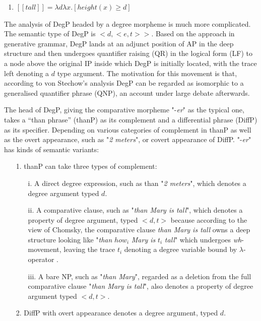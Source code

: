 \documentclass{ctexart}
\let \cite \parencite
\begin{document}
\begin{enumerate}[resume]
    \item \label{von_stechow_LE} $[\![tall]\!] = \lambda d \lambda x. [height(x) \geq d]$
\end{enumerate}

The analysis of DegP headed by a degree morpheme is much more complicated. The semantic type of DegP is $<d,<e,t>>$. Based on the approach in generative grammar, DegP lands at an adjunct position of AP in the deep structure and then undergoes quantifier raising (QR) in the logical form (LF) to a node above the original IP inside which DegP is initially located, with the trace left denoting a $d$ type argument. The motivation for this movement is that, according to von Stechow’s analysis DegP can be regarded as isomorphic to a generalised quantifier phrase (QNP), an account under large debate afterwards.

The head of DegP, giving the comparative morpheme "-\textit{er}" as the typical one, takes a “than phrase” (thanP) as its complement and a differential phrase (DiffP) as its specifier. Depending on various categories of complement in thanP as well as the overt appearance, such as "\textit{2 meters}", or covert appearance of DiffP. "-\textit{er}" has kinds of semantic variants:

\begin{itemize}
\item[1.]
thanP can take three types of complement:

\begin{itemize}
\item[i.]
A direct degree expression, such as than "\textit{2 meters}", which denotes a degree argument typed $d$.
\item[ii.]
A comparative clause, such as "\textit{than Mary is tall}", which denotes a property of degree argument, typed $<d,t>$ because according to the view of Chomsky, the comparative clause \textit{than Mary is tall} owns a deep structure looking like "\textit{than} $how_i$ \textit{Mary is} $t_i$ \textit{tall}" which undergoes \textit{wh}-movement, leaving the trace $t_i$ denoting a degree variable bound by $\lambda$-operator \cite{chomsky1977}.
\item[iii.]
A bare NP, such as "\textit{than Mary}", regarded as a deletion from the full comparative clause "\textit{than Mary is tall}", also denotes a property of degree argument typed $<d,t>$.
\end{itemize}

\item[2.]
DiffP with overt appearance denotes a degree argument, typed $d$.

\end{itemize}
\end{document}
